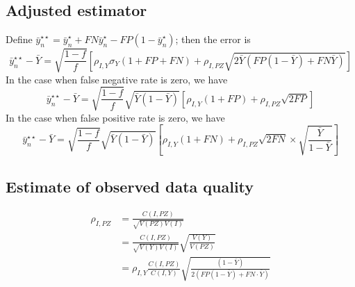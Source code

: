 \documentclass[11pt]{amsart}
\begin{document}
\subsection{Adjusted estimator}

Define $\bar y_n^{\star \star} = \bar y_n^\star + FN \bar y_n^\star - FP(1-\bar y_n^\star)$; then the error is
$$
\bar y_n^{\star \star} - \bar Y = \sqrt{\frac{1-f}{f}} \left[ \rho_{I, Y} \sigma_{Y} (1+FP+FN)  + \rho_{I, PZ} \sqrt{ 2 \bar Y \left( FP (1-\bar Y) + FN \bar Y \right)} \right]
$$
In the case when false negative rate is zero, we have
$$
\bar y_n^{\star \star} - \bar Y = \sqrt{\frac{1-f}{f}} \sqrt{\bar Y(1-\bar Y)} \left[ \rho_{I, Y} (1+FP) + \rho_{I, PZ} \sqrt{ 2 FP } \right]
$$
In the case when false positive rate is zero, we have
$$
\bar y_n^{\star \star} - \bar Y = \sqrt{\frac{1-f}{f}} \sqrt{\bar Y(1-\bar Y)} \left[ \rho_{I, Y} (1+FN) + \rho_{I, PZ} \sqrt{ 2 FN } \times \sqrt{\frac{\bar Y}{1-\bar Y}} \right]
$$


\subsection{Estimate of observed data quality}

$$
\begin{aligned}
\rho_{I,PZ} &= \frac{C(I, PZ)}{\sqrt{V(PZ) V(I)}} \\
&= \frac{C(I, PZ)}{\sqrt{V(Y) V(I)}} \sqrt{\frac{V(Y)}{V(PZ)}} \\
&= \rho_{I,Y} \frac{C(I,PZ)}{C(I,Y)} \sqrt{ \frac{(1-\bar Y)}{2 ( FP (1-\bar Y) + FN \cdot \bar Y)} }
\end{aligned}
$$
\end{document}
